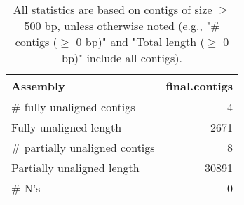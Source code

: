 \documentclass[12pt,a4paper]{article}
\begin{document}
\begin{table}[ht]
\begin{center}
\caption{All statistics are based on contigs of size $\geq$ 500 bp, unless otherwise noted (e.g., "\# contigs ($\geq$ 0 bp)" and "Total length ($\geq$ 0 bp)" include all contigs).}
\begin{tabular}{|l*{1}{|r}|}
\hline
Assembly & final.contigs \\ \hline
\# fully unaligned contigs & 4 \\ \hline
Fully unaligned length & 2671 \\ \hline
\# partially unaligned contigs & 8 \\ \hline
Partially unaligned length & 30891 \\ \hline
\# N's & 0 \\ \hline
\end{tabular}
\end{center}
\end{table}
\end{document}
